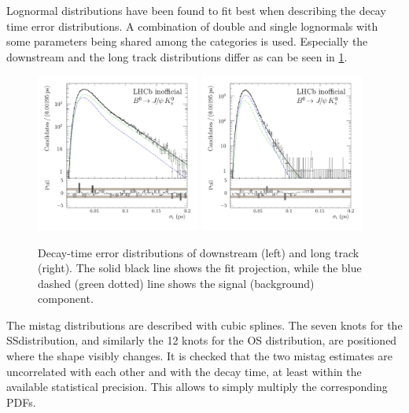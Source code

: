 Lognormal distributions have been found to fit best when describing the decay
time error distributions. A combination of double and single lognormals with
some parameters being shared among the categories is used. Especially the
downstream and the long track distributions differ as can be seen in
\cref{fig:bd2jpsiks:nominalfit:time_error}.

\begin{figure}[htb]
\includegraphics[width=0.48\textwidth]{06-Bd2JpsiKS/tikz/pdf/obsTimeErr_downstream_pull_logy.pdf}
\includegraphics[width=0.48\textwidth]{06-Bd2JpsiKS/tikz/pdf/obsTimeErr_longtrack_pull_logy.pdf}
\caption{
Decay-time error distributions of downstream (left) and long track (right). The solid black line
shows the fit projection, while the blue dashed (green dotted) line shows the
signal (background) component.}
\label{fig:bd2jpsiks:nominalfit:time_error}
\end{figure}

The mistag distributions are described with cubic splines. The seven knots for
the SS\pion distribution, and similarly the 12 knots for the OS distribution,
are positioned where the shape visibly changes. It is checked that the two
mistag estimates are uncorrelated with each other and with the decay time, at
least within the available statistical precision. This allows to simply
multiply the corresponding PDFs.

